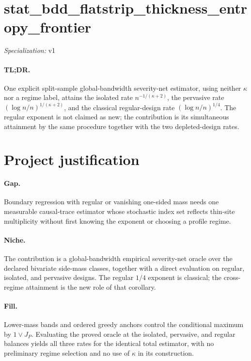 \documentclass{article}
\begin{document}
\sloppy

\section*{stat\_\allowbreak{}bdd\_\allowbreak{}flatstrip\_\allowbreak{}thickness\_\allowbreak{}entropy\_\allowbreak{}frontier}

\noindent\textit{Specialization:} v1\par

\paragraph{TL;DR.} One explicit split-sample global-bandwidth severity-net estimator, using neither \(\kappa\) nor a regime label, attains the isolated rate \(n^{-1/(\kappa+2)}\), the pervasive rate \((\log n/n)^{1/(\kappa+2)}\), and the classical regular-design rate \((\log n/n)^{1/4}\). The regular exponent is not claimed as new; the contribution is its simultaneous attainment by the same procedure together with the two depleted-design rates.

\section{Project justification}

\paragraph{Gap.} Boundary regression with regular or vanishing one-sided mass needs one measurable causal-trace estimator whose stochastic index set reflects thin-site multiplicity without first knowing the exponent or choosing a profile regime.

\paragraph{Niche.} The contribution is a global-bandwidth empirical severity-net oracle over the declared bivariate side-mass classes, together with a direct evaluation on regular, isolated, and pervasive designs. The regular \(1/4\) exponent is classical; the cross-regime attainment is the new role of that corollary.

\paragraph{Fill.} Lower-mass bands and ordered greedy anchors control the conditional maximum by \(1\vee J_P\). Evaluating the proved oracle at the isolated, pervasive, and regular balances yields all three rates for the identical total estimator, with no preliminary regime selection and no use of \(\kappa\) in its construction.
\end{document}
